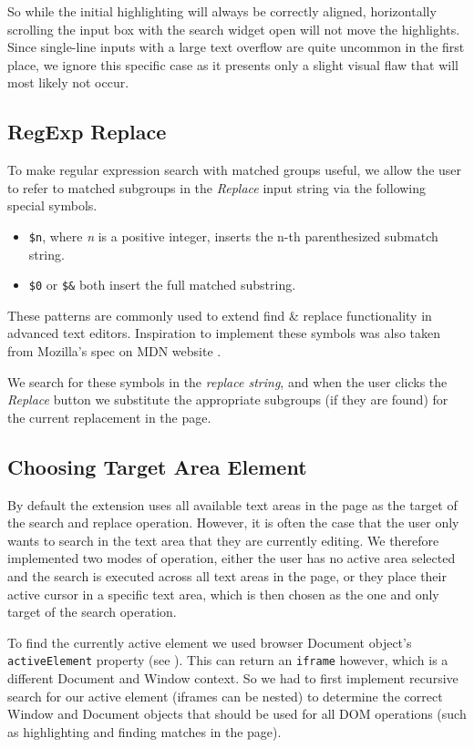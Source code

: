 \documentclass[bsc,frontabs,twoside,singlespacing,parskip,deptreport]{infthesis}
\providecommand{\tightlist}{%
  \setlength{\itemsep}{0pt}\setlength{\parskip}{0pt}}
\begin{document}
So while the initial highlighting will always be correctly aligned, horizontally scrolling the input box with the search widget open will not move the highlights. Since single-line inputs with a large text overflow are quite uncommon in the first place, we ignore this specific case as it presents only a slight visual flaw that will most likely not occur.

\subsection{RegExp Replace}
To make regular expression search with matched groups useful, we allow the user to refer to matched subgroups in the \textit{Replace} input string via the following special symbols.

\begin{itemize}
\tightlist
\item
  \texttt{\$n}, where \textit{n} is a positive integer, inserts the n-th parenthesized submatch string.
\item
  \texttt{\$0} or \texttt{\$\&} both insert the full matched substring.
\end{itemize}

These patterns are commonly used to extend find \& replace functionality in advanced text editors. Inspiration to implement these symbols was also taken from Mozilla's spec on MDN website \cite{M9}.

We search for these symbols in the \textit{replace string}, and when the user clicks the \textit{Replace} button we substitute the appropriate subgroups (if they are found) for the current replacement in the page.

\subsection{Choosing Target Area Element}
By default the extension uses all available text areas in the page as the target of the search and replace operation. However, it is often the case that the user only wants to search in the text area that they are currently editing. We therefore implemented two modes of operation, either the user has no active area selected and the search is executed across all text areas in the page, or they place their active cursor in a specific text area, which is then chosen as the one and only target of the search operation.

To find the currently active element we used browser Document object's \texttt{activeElement} property (see \cite{M10}). This can return an \texttt{iframe} however, which is a different Document and Window context. So we had to first implement recursive search for our active element (iframes can be nested) to determine the correct Window and Document objects that should be used for all DOM operations (such as highlighting and finding matches in the page).
\end{document}
